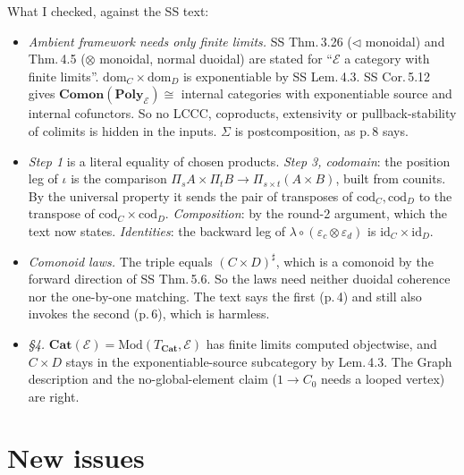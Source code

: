 \documentclass[10pt]{amsart}
\newcommand{\tri}{\mathbin{\triangleleft}}
\newcommand{\Poly}{\mathbf{Poly}}
\newcommand{\Cat}{\mathbf{Cat}}
\newcommand{\Comon}{\mathbf{Comon}}
\newcommand{\E}{\mathcal{E}}
\begin{document}
What I checked, against the SS text:
\begin{itemize}[leftmargin=*]
\item \emph{Ambient framework needs only finite limits.} SS Thm.\,3.26 ($\tri$ monoidal) and Thm.\,4.5 ($\otimes$
  monoidal, normal duoidal) are stated for ``$\E$ a category with finite limits''. $\mathrm{dom}_C\times
  \mathrm{dom}_D$ is exponentiable by SS Lem.\,4.3. SS Cor.\,5.12 gives $\Comon(\Poly_\E)\cong$ internal categories
  with exponentiable source and internal cofunctors. So no LCCC, coproducts, extensivity or pullback-stability of
  colimits is hidden in the inputs. $\Sigma$ is postcomposition, as p.\,8 says.
\item \emph{Step 1} is a literal equality of chosen products. \emph{Step 3, codomain}: the position leg of $\iota$
  is the comparison $\Pi_{s}A\times\Pi_{t}B\to\Pi_{s\times t}(A\times B)$, built from counits. By the universal
  property it sends the pair of transposes of $\mathrm{cod}_C,\mathrm{cod}_D$ to the transpose of
  $\mathrm{cod}_C\times\mathrm{cod}_D$. \emph{Composition}: by the round-2 argument, which the text now states.
  \emph{Identities}: the backward leg of $\lambda\circ(\varepsilon_c\otimes\varepsilon_d)$ is
  $\mathrm{id}_C\times\mathrm{id}_D$.
\item \emph{Comonoid laws.} The triple equals $(C\times D)^\sharp$, which is a comonoid by the forward direction of
  SS Thm.\,5.6. So the laws need neither duoidal coherence nor the one-by-one matching. The text says the first
  (p.\,4) and still also invokes the second (p.\,6), which is harmless.
\item \emph{\S4.} $\Cat(\E)=\mathrm{Mod}(T_{\Cat},\E)$ has finite limits computed objectwise, and $C\times D$
  stays in the exponentiable-source subcategory by Lem.\,4.3. The Graph description and the no-global-element
  claim ($1\to C_0$ needs a looped vertex) are right.
\end{itemize}

\section{New issues}
\end{document}
